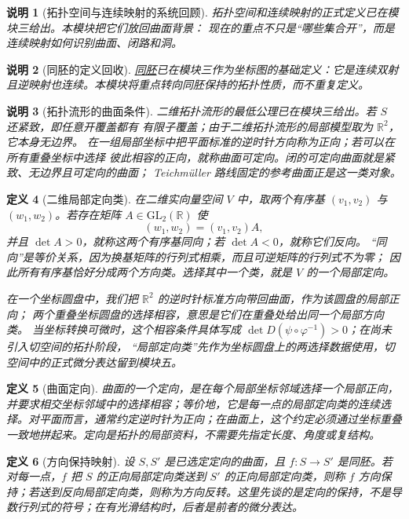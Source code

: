 \documentclass[UTF8,fontset=none,a4paper,11pt]{ctexart}
\theoremstyle{foundation-definition}
\newtheorem{definition}{定义}[section]
\theoremstyle{foundation-theorem}
\theoremstyle{foundation-proposition}
\theoremstyle{foundation-example}
\theoremstyle{foundation-remark}
\newtheorem{remark}[definition]{说明}
\theoremstyle{foundation-theorem}
\newcommand{\term}[2]{\hyperref[#1]{#2}}
\begin{document}
\begin{remark}[拓扑空间与连续映射的系统回顾]
拓扑空间和连续映射的正式定义已在模块三给出。本模块把它们放回曲面背景：
现在的重点不只是“哪些集合开”，而是连续映射如何识别曲面、闭路和洞。
\end{remark}

\begin{remark}[同胚的定义回收]
\term{def:homeomorphism}{同胚}已在模块三作为坐标图的基础定义：它是连续双射且逆映射也连续。本模块将重点转向同胚保持的拓扑性质，而不重复定义。
\end{remark}

\begin{remark}[拓扑流形的曲面条件]
二维拓扑流形的最低公理已在模块三给出。若 \(S\) 还紧致，即任意开覆盖都有
有限子覆盖；由于二维拓扑流形的局部模型取为 \(\mathbb R^2\)，它本身无边界。
在一组局部坐标中把平面标准的逆时针方向称为正向；若可以在所有重叠坐标中选择
彼此相容的正向，就称曲面可定向。闭的可定向曲面就是紧致、无边界且可定向的曲面；
Teichmüller 路线固定的参考曲面正是这一类对象。
\end{remark}

\begin{definition}[二维局部定向类]\label{def:local-orientation-class}
在二维实向量空间 \(V\) 中，取两个有序基
\((v_1,v_2)\) 与 \((w_1,w_2)\)。若存在矩阵 \(A\in\mathrm{GL}_2(\mathbb R)\) 使
\[
(w_1,w_2)=(v_1,v_2)A,
\]
并且 \(\det A>0\)，就称这两个有序基同向；若 \(\det A<0\)，就称它们反向。
“同向”是等价关系，因为换基矩阵的行列式相乘，而且可逆矩阵的行列式不为零；
因此所有有序基恰好分成两个方向类。选择其中一个类，就是 \(V\) 的一个局部定向。

在一个坐标圆盘中，我们把 \(\mathbb R^2\) 的逆时针标准方向带回曲面，作为该圆盘的局部正向；
两个重叠坐标圆盘的选择相容，意思是它们在重叠处给出同一个局部方向类。
当坐标转换可微时，这个相容条件具体写成
\(\det D(\psi\circ\varphi^{-1})>0\)；在尚未引入切空间的拓扑阶段，
“局部定向类”先作为坐标圆盘上的两选择数据使用，切空间中的正式微分表达留到模块五。
\end{definition}

\begin{definition}[曲面定向]\label{def:surface-orientation}
曲面的一个定向，是在每个局部坐标邻域选择一个局部正向，并要求相交坐标邻域中的选择相容；等价地，它是每一点的局部定向类的连续选择。对平面而言，通常约定逆时针为正向；在曲面上，这个约定必须通过坐标重叠一致地拼起来。定向是拓扑的局部资料，不需要先指定长度、角度或复结构。
\end{definition}

\begin{definition}[方向保持映射]\label{def:orientation-preserving}
设 \(S,S'\) 是已选定定向的曲面，且 \(f:S\to S'\) 是同胚。若对每一点，\(f\) 把 \(S\) 的正向局部定向类送到 \(S'\) 的正向局部定向类，则称 \(f\) 方向保持；若送到反向局部定向类，则称为方向反转。这里先谈的是定向的保持，不是导数行列式的符号；在有光滑结构时，后者是前者的微分表达。
\end{definition}
\end{document}
